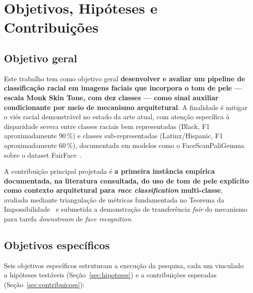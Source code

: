 \section{Objetivos, Hipóteses e Contribuições}
\label{sec:objetivos}

\subsection{Objetivo geral}
\label{sec:obj_geral}

Este trabalho tem como objetivo geral \textbf{desenvolver e avaliar um pipeline de classificação racial em imagens faciais que incorpora o tom de pele --- escala Monk Skin Tone, com dez classes --- como sinal auxiliar condicionante por meio de mecanismo arquitetural}. A finalidade é mitigar o viés racial demonstrável no estado da arte atual, com atenção específica à disparidade severa entre classes raciais bem representadas (Black, F1 aproximadamente 90\,\%) e classes sub-representadas (Latinx/Hispanic, F1 aproximadamente 60\,\%), documentada em modelos como o FaceScanPaliGemma sobre o dataset FairFace~\autocite{aldahoul2024exploring}.

A contribuição principal projetada é \textbf{a primeira instância empírica documentada, na literatura consultada, do uso de tom de pele explícito como contexto arquitetural para \emph{race classification} multi-classe}, avaliada mediante triangulação de métricas fundamentada no Teorema da Impossibilidade~\autocite{kleinberg2017inherent} e submetida a demonstração de transferência \emph{fair} do mecanismo para tarefa \emph{downstream} de \emph{face recognition}.

\subsection{Objetivos específicos}
\label{sec:obj_especificos}

Seis objetivos específicos estruturam a execução da pesquisa, cada um vinculado a hipóteses testáveis (Seção~\ref{sec:hipoteses}) e a contribuições esperadas (Seção~\ref{sec:contribuicoes}):

